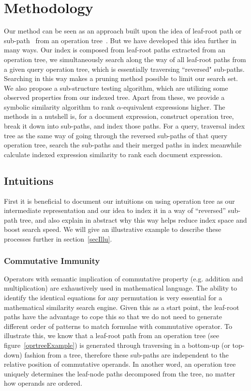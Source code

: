 \chapter{Methodology}
Our method can be seen as an approach built upon the idea of leaf-root path or sub-path~\cite{signifjap,MathMLleafroot,signfused,sefobyfo} from an operation tree~\cite{goodsurvey}. 
But we have developed this idea further in many ways. 
Our index is composed from leaf-root paths extracted from an operation tree, we simultaneously search along the way of all leaf-root paths from a given query operation tree, which is essentially traversing ``reversed" sub-paths.
Searching in this way makes a pruning method possible to limit our search set. 
We also propose a sub-structure testing algorithm, which are utilizing some observed properties from our indexed tree. 
Apart from these, we provide a symbolic similarity algorithm to rank $\alpha$-equivalent expressions higher.
The methods in a nutshell is, for a document expression, construct operation tree, break it down into sub-paths, and index those paths. For a query, traversal index tree as the same way of going through the reversed sub-paths of that query operation tree, search the sub-paths and their merged paths in index meanwhile calculate indexed expression similarity to rank each document expression.

\section{Intuitions}
First it is beneficial to document our intuitions on using operation tree as our intermediate representation and our idea to index it in a way of “reversed” sub-path tree, and also explain in abstract why this way helps reduce index space and boost search speed.
We will give an illustrative example to describe these processes further in section~\ref{secIllu}.

\subsection{Commutative Immunity}
Operators with semantic implication of commutative property (e.g. addition and multiplication) are exhaustively used in mathematical language. The ability to identify the identical equations for any permutation is very essential for a mathematical similarity search engine. 
Given this as a start point, the leaf-root paths have the advantage to cope this so that we do not need to generate different order of patterns to match formulae with commutative operator. 
To illustrate this, we know that a leaf-root path from an operation tree (see figure~\ref{oprtreeExample}) is generated through traversing in a bottom-up (or top-down) fashion from a tree, therefore these sub-paths are independent to the relative position of commutative operands.
In another word, an operation tree uniquely determines the leaf-node paths decomposed from the tree, no matter how operands are ordered. 

